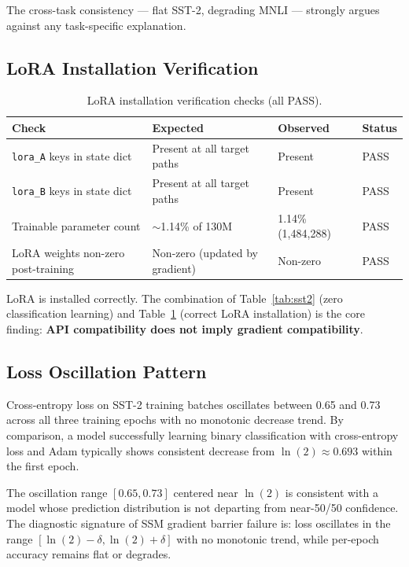 The cross-task consistency --- flat SST-2, degrading MNLI --- strongly argues against any task-specific explanation.

\subsection{LoRA Installation Verification}

\begin{table}[h]
\centering
\caption{LoRA installation verification checks (all PASS).}
\label{tab:lora_verify}
\begin{tabular}{@{}llll@{}}
\toprule
\textbf{Check} & \textbf{Expected} & \textbf{Observed} & \textbf{Status} \\
\midrule
\texttt{lora\_A} keys in state dict & Present at all target paths & Present & PASS \\
\texttt{lora\_B} keys in state dict & Present at all target paths & Present & PASS \\
Trainable parameter count & $\sim$1.14\% of 130M & 1.14\% (1,484,288) & PASS \\
LoRA weights non-zero post-training & Non-zero (updated by gradient) & Non-zero & PASS \\
\bottomrule
\end{tabular}
\end{table}

LoRA is installed correctly. The combination of Table~\ref{tab:sst2} (zero classification learning) and Table~\ref{tab:lora_verify} (correct LoRA installation) is the core finding: \textbf{API compatibility does not imply gradient compatibility}.

\subsection{Loss Oscillation Pattern}

Cross-entropy loss on SST-2 training batches oscillates between 0.65 and 0.73 across all three training epochs with no monotonic decrease trend. By comparison, a model successfully learning binary classification with cross-entropy loss and Adam typically shows consistent decrease from $\ln(2) \approx 0.693$ within the first epoch.

The oscillation range $[0.65, 0.73]$ centered near $\ln(2)$ is consistent with a model whose prediction distribution is not departing from near-50/50 confidence. The diagnostic signature of SSM gradient barrier failure is: loss oscillates in the range $[\ln(2) - \delta, \ln(2) + \delta]$ with no monotonic trend, while per-epoch accuracy remains flat or degrades.

